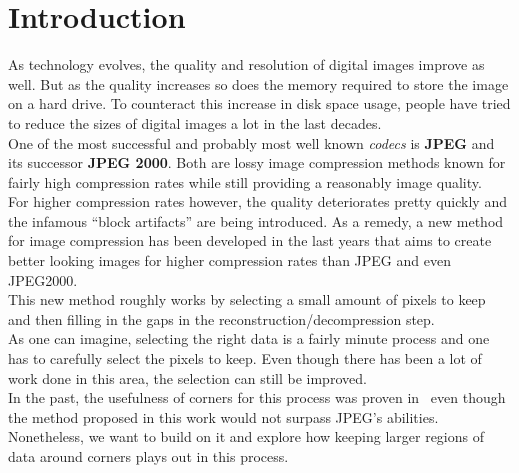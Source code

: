 \chapter{Introduction}\label{ch:Intro}
As technology evolves, the quality and resolution of digital images improve as well. But as the
quality increases so does the memory required to store the image on a hard drive. To counteract
this increase in disk space usage, people have tried to reduce the sizes of digital images a lot in the
last decades.\\
One of the most successful and probably most well known \textit{codecs}
is \textbf{JPEG} and its successor \textbf{JPEG 2000}. Both are lossy image compression methods
known for fairly high compression rates while still providing a reasonably image quality.\\
For
higher compression rates however, the quality deteriorates pretty quickly and the infamous ``block
artifacts'' are being introduced. As a remedy, a new method for image compression has been developed in the last years that
aims to create better looking images for higher compression rates than JPEG and even JPEG2000. \\
This new method roughly works by selecting a small amount of pixels to keep and then filling in
the gaps in the reconstruction/decompression step.\\
As one can imagine, selecting the right data is a fairly minute process and one has to carefully
select the pixels to keep. Even though there has been a lot of work done in this area, the
selection can still be improved.\\
In the past, the usefulness of corners for this process was proven in~\cite{zimmer07} even though the
method proposed in this work would not surpass JPEG's abilities. Nonetheless, we want to build on
it and explore
how keeping larger regions of data around corners plays out in this process.
